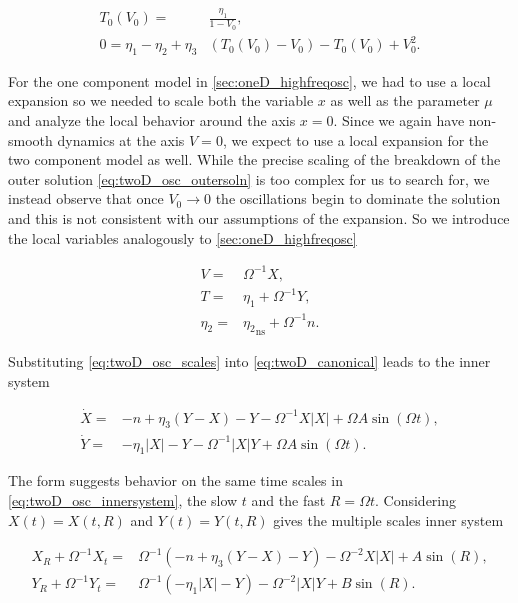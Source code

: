 \begin{equation*} \label{eq:twoD_lowerleadingorder}
\begin{aligned}
T_0(V_0)=&\frac{\eta_1}{1-V_0},\\
0=\eta_1-\eta_2+\eta_3&(T_0(V_0)-V_0)-T_0(V_0)+V_0^2.
\end{aligned}
\end{equation*}

\indent For the one component model in \autoref{sec:oneD_highfreqosc}, we had to use a local expansion so we needed to scale both the variable $x$ as well as the parameter $\mu$ and analyze the local behavior around the axis $x=0$. Since we again have non-smooth dynamics at the axis $V=0$, we expect to use a local expansion for the two component model as well. While the precise scaling of the breakdown of the outer solution \eqref{eq:twoD_osc_outersoln} is too complex for us to search for, we instead observe that once $V_0\to0$ the oscillations begin to dominate the solution and this is not consistent with our assumptions of the expansion. So we introduce the local variables analogously to \autoref{sec:oneD_highfreqosc}

\begin{equation}\label{eq:twoD_osc_scales}
\begin{aligned}
V=&\Omega^{-1}X,\\
T=& \eta_1 +\Omega^{-1}Y,\\
\eta_2=&{\eta_2}_{\text{ns}}+\Omega^{-1} n.
\end{aligned}
\end{equation}

Substituting \eqref{eq:twoD_osc_scales} into \eqref{eq:twoD_canonical} leads to the inner system

\begin{equation}\label{eq:twoD_osc_innersystem}
\begin{aligned}
\dot{X}=& -n+\eta_3(Y-X)-Y-\Omega^{-1}X|X| +\Omega A\sin(\Omega t),\\
\dot{Y}=& -\eta_1|X|-Y -\Omega^{-1}|X|Y +\Omega A \sin(\Omega t).
\end{aligned}
\end{equation}

The form suggests behavior on the same time scales in \eqref{eq:twoD_osc_innersystem}, the slow $t$ and the fast $R=\Omega t$. Considering $X(t)=X(t,R)$ and $Y(t)=Y(t,R)$ gives the multiple scales inner system

\begin{equation}\label{eq:twoD_osc_innermulti}
\begin{aligned}
X_R+\Omega^{-1}X_t =& \Omega^{-1}\left(-n +\eta_3(Y-X)-Y\right)-\Omega^{-2}X|X|+A\sin(R),\\
Y_R+\Omega^{-1}Y_t =& \Omega^{-1}\left(-\eta_1|X|-Y\right)-\Omega^{-2}|X|Y+ B\sin(R).
\end{aligned}
\end{equation}

